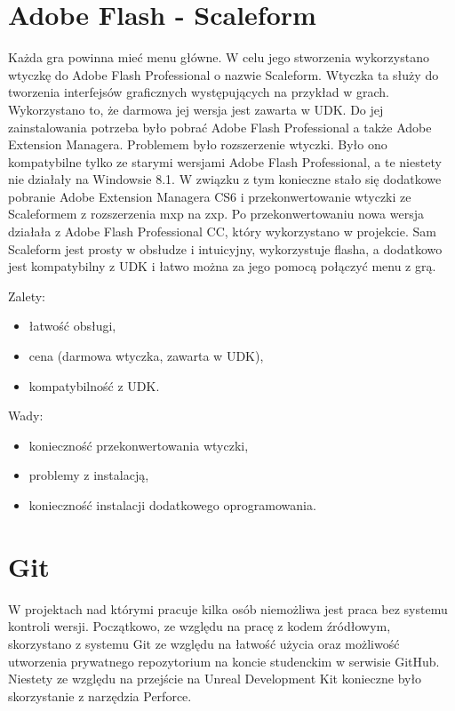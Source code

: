\section{Adobe Flash - Scaleform}

Każda gra powinna mieć menu główne. W celu jego stworzenia wykorzystano wtyczkę do Adobe Flash Professional o nazwie Scaleform. Wtyczka ta służy do tworzenia interfejsów graficznych występujących na przykład w grach. Wykorzystano to, że darmowa jej wersja jest zawarta w UDK. Do jej zainstalowania potrzeba było pobrać Adobe Flash Professional a także Adobe Extension Managera. Problemem było rozszerzenie wtyczki. Było ono kompatybilne tylko ze starymi wersjami Adobe Flash Professional, a te niestety nie działały na Windowsie 8.1. W związku z tym konieczne stało się dodatkowe pobranie 
Adobe Extension Managera CS6 i przekonwertowanie wtyczki ze Scaleformem z rozszerzenia mxp na zxp.
Po przekonwertowaniu nowa wersja działała z Adobe Flash Professional CC, który wykorzystano w projekcie. Sam Scaleform jest prosty w obsłudze i intuicyjny, wykorzystuje flasha, a dodatkowo jest kompatybilny z UDK i łatwo można za jego pomocą połączyć menu z grą.

{\raggedright Zalety:
\begin{itemize}
\item łatwość obsługi,
\item cena (darmowa wtyczka, zawarta w UDK),
\item kompatybilność z UDK.
\end{itemize}

\raggedright Wady:
\begin{itemize}
\item konieczność przekonwertowania wtyczki,
\item problemy z instalacją,
\item konieczność instalacji dodatkowego oprogramowania.
\end{itemize}
}

\section{Git}

W projektach nad którymi pracuje kilka osób niemożliwa jest praca bez systemu kontroli wersji. Początkowo, ze względu na pracę z kodem źródłowym, skorzystano z systemu Git ze względu na łatwość użycia oraz możliwość utworzenia prywatnego repozytorium na koncie studenckim w serwisie GitHub. Niestety ze względu na przejście na Unreal Development Kit konieczne było skorzystanie z narzędzia Perforce.\\

